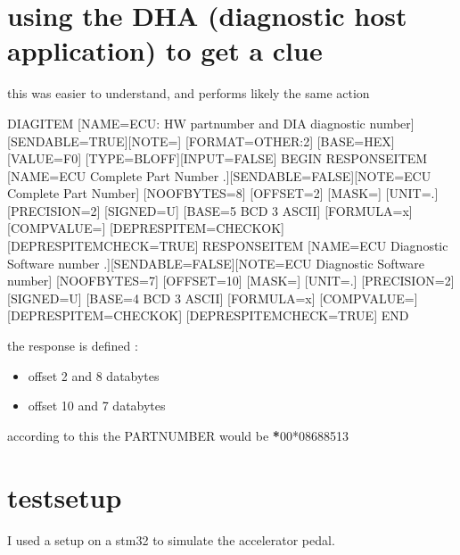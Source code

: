 \documentclass[letterpaper,10pt,english]{sphinxmanual}
\begin{document}
\section{using the DHA (diagnostic host application) to get a clue}
\label{\detokenize{makingsense/respons:using-the-dha-diagnostic-host-application-to-get-a-clue}}
\sphinxAtStartPar
this was easier to understand, and performs likely the same action

\begin{sphinxVerbatim}[commandchars=\\\{\}]
DIAG\PYGZus{}ITEM [NAME=ECU: HW partnumber and DIA diagnostic number][SEND\PYGZus{}ABLE=TRUE][NOTE=] [FORMAT=OTHER:2] [BASE=HEX] [VALUE=F0] [TYPE=BLOFF][INPUT=FALSE]
BEGIN
  RESPONSE\PYGZus{}ITEM [NAME=ECU Complete Part Number .][SEND\PYGZus{}ABLE=FALSE][NOTE=ECU Complete Part Number] [NO\PYGZus{}OF\PYGZus{}BYTES=8] [OFFSET=2] [MASK=] [UNIT=.] [PRECISION=2] [SIGNED=U] [BASE=5 BCD 3 ASCII] [FORMULA=x] [COMP\PYGZus{}VALUE=] [DEP\PYGZus{}RESPITEM=CHECKOK] [DEP\PYGZus{}RESPITEM\PYGZus{}CHECK=TRUE]
  RESPONSE\PYGZus{}ITEM [NAME=ECU Diagnostic Software number .][SEND\PYGZus{}ABLE=FALSE][NOTE=ECU Diagnostic Software number] [NO\PYGZus{}OF\PYGZus{}BYTES=7] [OFFSET=10] [MASK=] [UNIT=.] [PRECISION=2] [SIGNED=U] [BASE=4 BCD 3 ASCII] [FORMULA=x] [COMP\PYGZus{}VALUE=] [DEP\PYGZus{}RESPITEM=CHECKOK] [DEP\PYGZus{}RESPITEM\PYGZus{}CHECK=TRUE]
END
\end{sphinxVerbatim}

\sphinxAtStartPar
the response is defined :
\begin{itemize}
\item {} 
\sphinxAtStartPar
offset 2 and 8 databytes

\item {} 
\sphinxAtStartPar
offset 10 and 7 databytes

\end{itemize}

\sphinxAtStartPar
according to this the PARTNUMBER would be {\color{red}\bfseries{}*}00*08688513


\section{test\sphinxhyphen{}setup}
\label{\detokenize{makingsense/test-setup:test-setup}}\label{\detokenize{makingsense/test-setup::doc}}
\sphinxAtStartPar
I used a setup on a stm32 to simulate the accelerator pedal.

\sphinxAtStartPar
{}
\end{document}

